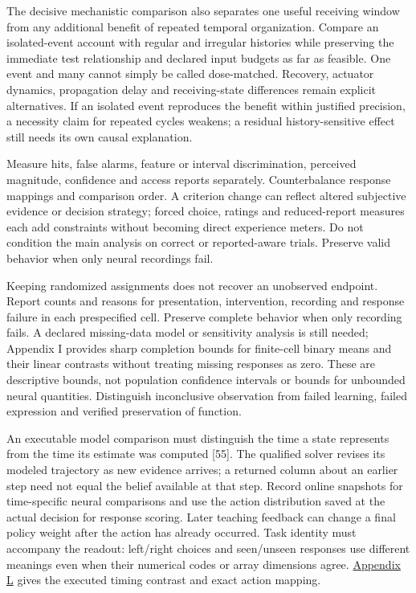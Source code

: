 \documentclass[
  american,
  11pt,
  letterpaper,
]{article}
\begin{document}
The decisive mechanistic comparison also separates one useful receiving window from any additional benefit of repeated temporal organization. Compare an isolated-event account with regular and irregular histories while preserving the immediate test relationship and declared input budgets as far as feasible. One event and many cannot simply be called dose-matched. Recovery, actuator dynamics, propagation delay and receiving-state differences remain explicit alternatives. If an isolated event reproduces the benefit within justified precision, a necessity claim for repeated cycles weakens; a residual history-sensitive effect still needs its own causal explanation.

Measure hits, false alarms, feature or interval discrimination, perceived magnitude, confidence and access reports separately. Counterbalance response mappings and comparison order. A criterion change can reflect altered subjective evidence or decision strategy; forced choice, ratings and reduced-report measures each add constraints without becoming direct experience meters. Do not condition the main analysis on correct or reported-aware trials. Preserve valid behavior when only neural recordings fail.

Keeping randomized assignments does not recover an unobserved endpoint. Report counts and reasons for presentation, intervention, recording and response failure in each prespecified cell. Preserve complete behavior when only recording fails. A declared missing-data model or sensitivity analysis is still needed; Appendix I provides sharp completion bounds for finite-cell binary means and their linear contrasts without treating missing responses as zero. These are descriptive bounds, not population confidence intervals or bounds for unbounded neural quantities. Distinguish inconclusive observation from failed learning, failed expression and verified preservation of function.

An executable model comparison must distinguish the time a state represents from the time its estimate was computed {[}55{]}. The qualified solver revises its modeled trajectory as new evidence arrives; a returned column about an earlier step need not equal the belief available at that step. Record online snapshots for time-specific neural comparisons and use the action distribution saved at the actual decision for response scoring. Later teaching feedback can change a final policy weight after the action has already occurred. Task identity must accompany the readout: left/right choices and seen/unseen responses use different meanings even when their numerical codes or array dimensions agree. \href{https://raw.githubusercontent.com/v5ma/v5ma.github.io/master/papers/companions/learning-to-feel-v1.0/Learning-to-Feel-Technical-Supplement-v1.0.pdf\#appendix-l}{Appendix L} gives the executed timing contrast and exact action mapping.
\end{document}
